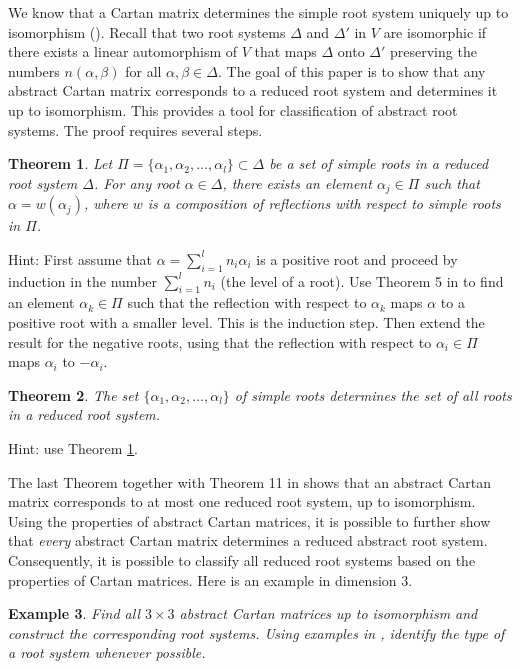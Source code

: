 \documentclass[11pt]{amsart}
\newtheorem{theorem}{Theorem}
\newtheorem{example}[theorem]{Example}
\begin{document}
We know that a  Cartan matrix determines the simple root system uniquely 
up to isomorphism (\cite{5}). 
Recall that two root systems $\Delta$ and $\Delta'$ in 
$V$ are isomorphic if there exists a linear automorphism of $V$ that 
maps $\Delta$ onto $\Delta'$ preserving the numbers $n(\alpha, \beta)$ 
for all $\alpha, \beta \in \Delta$. 
The goal of this paper is to show that any abstract Cartan matrix corresponds 
to a reduced root system and determines it up to isomorphism. 
This provides a tool for classification of abstract root systems. 
The proof requires several steps. 

\begin{theorem} \label{W}
Let $\Pi = \{\alpha_1, \alpha_2, \ldots , \alpha_l \} 
\subset \Delta$ be a set of simple roots in a reduced root system 
$\Delta$. For any root $\alpha \in \Delta$, there exists an element 
$\alpha_j \in \Pi$ such that $\alpha = w(\alpha_j)$, where 
$w$ is a composition of reflections with respect to simple roots in $\Pi$. 
\end{theorem} 
Hint: First assume that $\alpha = \sum_{i=1}^l n_i \alpha_i$ 
is a positive root and proceed by induction in the number $\sum_{i=1}^l n_i$
(the level of a root). 
Use Theorem 5 in \cite{4} to find an 
element $\alpha_k \in \Pi$ such that the reflection with respect to 
$\alpha_k$ maps $\alpha$ to a positive root with a smaller 
level. This is the induction step. 
Then extend the result for the negative roots, using that 
the reflection with respect to $\alpha_i \in \Pi$ maps $\alpha_i$ to 
$-\alpha_i$. 

\begin{theorem} The set $\{\alpha_1, \alpha_2, \ldots, \alpha_l \}$ 
of simple roots determines the set of all roots in a reduced root system. 
\end{theorem} 
Hint: use Theorem \ref{W}. 

The last Theorem together with Theorem 11 in \cite{5} shows that 
an abstract Cartan matrix corresponds to at most one 
reduced root system, up to isomorphism. 
Using the properties of abstract Cartan matrices, 
it is possible to further show that \emph{every} 
abstract Cartan matrix determines a
reduced abstract root system.  Consequently, it is possible to classify 
all reduced root systems based on the properties of Cartan matrices. 
Here is an example in dimension $3$.

\begin{example} Find all $3\times3$ abstract Cartan matrices up to 
isomorphism and 
construct the corresponding root systems. Using examples in 
\cite{2,3,4,5}, identify the type of a root system whenever possible. 
\end{example} 
\end{document}
